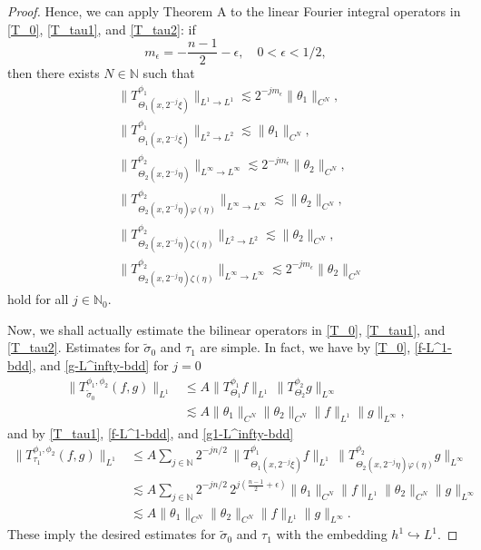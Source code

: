 \documentclass[12pt]{amsart}
\numberwithin{equation}{section}
\theoremstyle{plain}
\theoremstyle{definition}
\newcommand{\N}{\mathbb{N}}
\begin{document}
\begin{proof}
Hence, 
we can apply
Theorem A to 
the linear Fourier integral operators
in \eqref{T_0}, \eqref{T_tau1}, and \eqref{T_tau2}:
if 
\[
m_{\epsilon} 
= - \frac{n-1}{2} - \epsilon,
\quad
0 < \epsilon < 1/2,
\]
then 
there exists $N \in \N$
such that
\begin{align}
&\label{f-L^1-bdd}
\| T^{\phi_1}_{ \Theta_{1} (x, 2^{-j} \xi) } \|_{ L^{1} \to L^{1} } 
\lesssim 
2^{ -j m_\epsilon } 
\| \theta_1 \|_{ C^N } ,
\\
&\label{f-L^2-bdd}
\| T^{\phi_1}_{ \Theta_{1} (x, 2^{-j} \xi) } \|_{ L^{2} \to L^{2} } 
\lesssim 
\| \theta_1 \|_{ C^N } ,
\\
&\label{g-L^infty-bdd}
\| T^{\phi_2}_{ \Theta_{2} (x, 2^{-j} \eta)} \|_{ L^{\infty} \to L^{\infty} }
\lesssim 
2^{ -j m_\epsilon } 
\| \theta_2 \|_{ C^N } ,
\\
&\label{g1-L^infty-bdd}
\| T^{\phi_2}_{ \Theta_{2} (x, 2^{-j} \eta) \varphi(\eta) } \|_{ L^{\infty} \to L^{\infty} }
\lesssim 
\| \theta_2 \|_{ C^N } ,
\\
&\label{g2-L^2-bdd}
\| T^{\phi_2}_{ \Theta_{2} (x, 2^{-j} \eta) \zeta(\eta) } \|_{ L^{2} \to L^{2} }
\lesssim 
\| \theta_2 \|_{ C^N } ,
\\
&\label{g2-L^infty-bdd}
\| T^{\phi_2}_{ \Theta_{2} (x, 2^{-j} \eta) \zeta(\eta) } \|_{ L^{\infty} \to L^{\infty} }
\lesssim 
2^{- j m_\epsilon} \| \theta_2 \|_{ C^N } 
\end{align}
hold for all $j \in \N_0$.


Now, we shall actually estimate the bilinear operators
in \eqref{T_0}, \eqref{T_tau1}, and \eqref{T_tau2}.
Estimates for $\widetilde{\sigma}_0$ and $\tau_1$ are simple.
In fact, we have by 
\eqref{T_0},
\eqref{f-L^1-bdd}, and
\eqref{g-L^infty-bdd} for $j=0$
\begin{align*}
\| T_{ \widetilde{\sigma}_0 }^{\phi_1, \phi_2} (f, g) \|_{L^1}
&\le A
\| T^{\phi_1}_{ \Theta_{1} } f \|_{L^1} \,
\| T^{\phi_2}_{ \Theta_{2} } g \|_{L^{\infty}} 
\\&\lesssim A
\| \theta_1 \|_{ C^N } 
\| \theta_2 \|_{ C^N } 
\|f\|_{L^1} \|g\|_{L^\infty},
\end{align*}
and by 
\eqref{T_tau1},
\eqref{f-L^1-bdd}, and
\eqref{g1-L^infty-bdd}
\begin{align*}
\| T_{ \tau_1 }^{\phi_1, \phi_2} (f, g) \|_{L^1}
&\le A
\sum_{j \in \N } 
2^{-j n/2} \,
\| T^{\phi_1}_{ \Theta_1 (x, 2^{-j} \xi) } f \|_{L^1} \,
\| T^{\phi_2}_{ \Theta_2 (x, 2^{-j} \eta) \varphi(\eta) } g \|_{L^{\infty}} 
\\&\lesssim A
\sum_{j \in \N } 
2^{-j n/2} \, 2^{j(\frac{n-1}{2} + \epsilon)} 
\| \theta_1 \|_{ C^N } \|f\|_{L^1}
\| \theta_2 \|_{ C^N } \|g\|_{L^\infty}
\\&\lesssim A
\| \theta_1 \|_{ C^N } \| \theta_2 \|_{ C^N } 
\|f\|_{L^1} \|g\|_{L^\infty} .
\end{align*}
These imply the desired estimates for 
$\widetilde{\sigma}_0$ and $\tau_1$ 
with the embedding $h^1 \hookrightarrow L^1$.


\end{proof}
\end{document}

